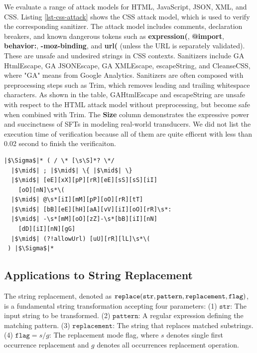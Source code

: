 We evaluate a range of attack models for HTML, JavaScript, JSON, XML, and CSS. Listing \ref{lst-css-attack} shows the CSS attack model, which is used to verify the corresponding sanitizer. The attack model includes comments, declaration breakers, and known dangerous tokens such as \textbf{expression(}, \textbf{@import}, \textbf{behavior:}, \textbf{-moz-binding}, and \textbf{url(} (unless the URL is separately validated).
These are unsafe and undesired strings in CSS contexts.
Sanitizers include GA HtmlEscape, GA JSONEscape, GA XMLEscape, escapeString, and CleanseCSS, where "GA" means from Google Analytics. Sanitizers are often composed with preprocessing steps such as Trim, which removes leading and trailing whitespace characters. As shown in the table, GAHtmlEscape and escapeString are unsafe with respect to the HTML attack model without preprocessing, but become safe when combined with Trim. The \textbf{Size} column demonstrates the expressive power and succinctness of SFTs in modeling real-world transducers. We did not list the execution time of verification because all of them are quite efficent with less than 0.02 second to finish the verificaiton.




\begin{lstlisting}[language={}, caption={CSS attack model for sanitizer verification.}, label={lst-css-attack}, float=htbp]
|$\Sigma$|* ( / \* [\s\S]*? \*/
  |$\mid$| ; |$\mid$| \{ |$\mid$| \}
  |$\mid$| [eE][xX][pP][rR][eE][sS][sS][iI]
    [oO][nN]\s*\(
  |$\mid$| @\s*[iI][mM][pP][oO][rR][tT]
  |$\mid$| [bB][eE][hH][aA][vV][iI][oO][rR]\s*:
  |$\mid$| -\s*[mM][oO][zZ]-\s*[bB][iI][nN]
    [dD][iI][nN][gG]
  |$\mid$| (?!allowUrl) [uU][rR][lL]\s*\(
 ) |$\Sigma$|*
\end{lstlisting}


\subsection{Applications to String Replacement}

The string replacement, denoted as
$\texttt{replace}(\texttt{str}, \texttt{pattern}, \newline\texttt{replacement}, \texttt{flag})$, is a fundamental string transformation accepting four parameters:
(1) $\texttt{str}$: The input string to be transformed.
(2) $\texttt{pattern}$: A regular expression defining the matching pattern.
(3) $\texttt{replacement}$: The string that replaces matched substrings.
(4) $\texttt{flag}=s/g$: The replacement mode flag, where $s$ denotes single first occurrence replacement and $g$ denotes all occurrences replacement operation.

